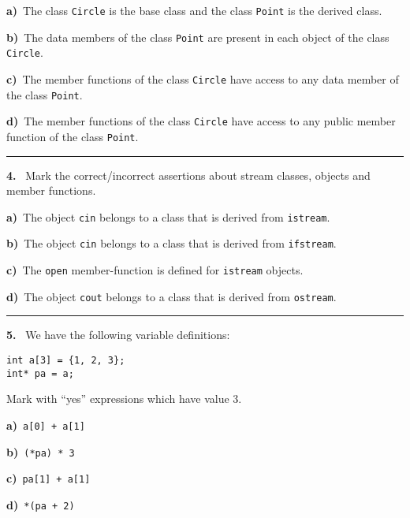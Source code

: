 \begin{multicols}{2}
{\bf a)}\ The class \verb|Circle| is the base class and the class \verb|Point| is the derived class.

{\bf b)}\ The data members of the class \verb|Point| are present in each object of the class \verb|Circle|.

{\bf c)}\ The member functions of the class \verb|Circle| have access to any data member of the class \verb|Point|.

{\bf d)}\ The member functions of the class \verb|Circle| have access to any public member function of the class \verb|Point|.

\par\smallskip\hrule\par\medskip

{\bf 4. }\ Mark the correct/incorrect assertions about stream classes, objects and
member functions.

{\bf a)}\ The object \verb|cin| belongs to a class that is derived from \verb|istream|.

{\bf b)}\ The object \verb|cin| belongs to a class that is derived from \verb|ifstream|.

{\bf c)}\ The \verb|open| member-function is defined for \verb|istream| objects.

{\bf d)}\ The object \verb|cout| belongs to a class that is derived from \verb|ostream|.

\par\smallskip\hrule\par\medskip

{\bf 5. }\ We have the following variable definitions:
 \vspace{-3mm}\begin{verbatim}
int a[3] = {1, 2, 3};
int* pa = a;
 \end{verbatim}\vspace{-6mm}
Mark with ``yes'' expressions which have value 3.

{\bf a)}\ \verb|a[0] + a[1]|

{\bf b)}\ \verb|(*pa) * 3|

{\bf c)}\ \verb|pa[1] + a[1]|

{\bf d)}\ \verb|*(pa + 2)|

\end{multicols}


